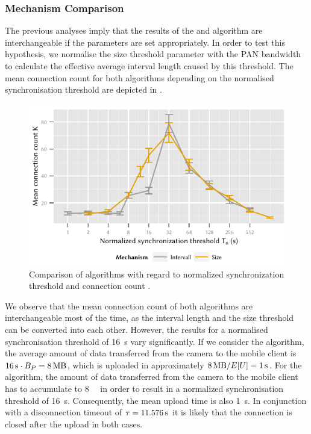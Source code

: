 \subsubsection*{Mechanism Comparison}\label{sec:application:cloud_file_synchronisation:numerical_evaluation:mechanism_comparison}
The previous analyses imply that the results of the \algointerval and \algosize algorithm are interchangeable if the parameters are set appropriately.
In order to test this hypothesis, we normalise the size threshold parameter \thresholdSize with the \gls{PAN} bandwidth to calculate the effective average interval length caused by this threshold.
The mean connection count \connectionCount for both algorithms depending on the normalised synchronisation threshold \thresholdNormalised are depicted in .
\begin{figure}
  \includegraphics{application/cloud_file_synchronization/numerical_evaluation/figures/comparison}
  \caption{Comparison of algorithms with regard to normalized synchronization threshold \thresholdNormalised and connection count \connectionCount.}
  \label{fig:application:cloud_file_synchronisation:numerical_evaluation:mechanism_comparison:comparison}
\end{figure}

We observe that the mean connection count \connectionCount of both algorithms are interchangeable most of the time, as the interval length \thresholdInterval and the size threshold \thresholdSize can be converted into each other.
However, the results for a normalised synchronisation threshold \thresholdNormalised of \SI{16}{\second} vary significantly.
If we consider the \algointerval algorithm, the average amount of data transferred from the camera to the mobile client is \(\SI{16}{\second} \cdot \panTransferRate=\SI{8}{\mega\byte}\), which is uploaded in approximately \(\SI{8}{\mega\byte} / E[U] = \SI{1}{\second}\).
For the \algosize algorithm, the amount of data transferred from the camera to the mobile client has to accumulate to \SI{8}{\mega\byte} in order to result in a normalized synchronisation threshold \thresholdNormalised of \SI{16}{\second}.
Consequently, the mean upload time is also \SI{1}{\second}.
In conjunction with a disconnection timeout of \(\tau = \SI{11.576}{\second}\) it is likely that the connection is closed after the upload in both cases.

